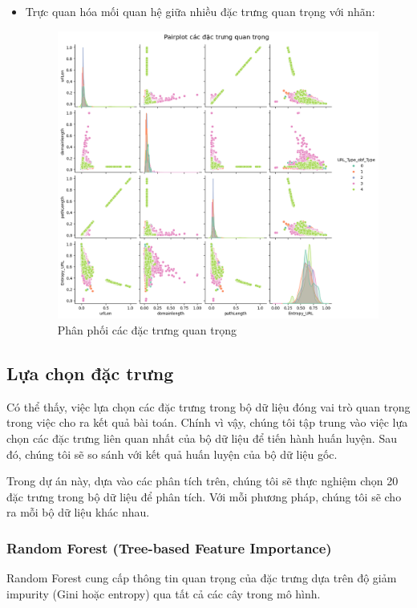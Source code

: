 \documentclass[13pt]{article}
\begin{document}
\begin{itemize}
\begin{itemize}
    \newpage
        \item Trực quan hóa mối quan hệ giữa nhiều đặc trưng quan trọng với nhãn:

    \begin{figure}[h!]
        \centering        \includegraphics[width=0.7\linewidth]{image/h18.png}
            \caption{Phân phối các đặc trưng quan trọng}
            \label{fig:label1}
    \end{figure}
    
    \end{itemize}
\end{itemize}

\subsection{Lựa chọn đặc trưng}
Có thể thấy, việc lựa chọn các đặc trưng trong bộ dữ liệu đóng vai trò quan trọng trong việc cho ra kết quả bài toán. Chính vì vậy, chúng tôi tập trung vào việc lựa chọn các đặc trưng liên quan nhất của bộ dữ liệu để tiến hành huấn luyện. Sau đó, chúng tôi sẽ so sánh với kết quả huấn luyện của bộ dữ liệu gốc.

Trong dự án này, dựa vào các phân tích trên, chúng tôi sẽ thực nghiệm chọn 20 đặc trưng trong bộ dữ liệu để phân tích. Với mỗi phương pháp, chúng tôi sẽ cho ra mỗi bộ dữ liệu khác nhau.

\subsubsection{Random Forest (Tree-based Feature Importance)}
Random Forest cung cấp thông tin quan trọng của đặc trưng dựa trên độ giảm impurity (Gini hoặc entropy) qua tất cả các cây trong mô hình.
\end{document}
